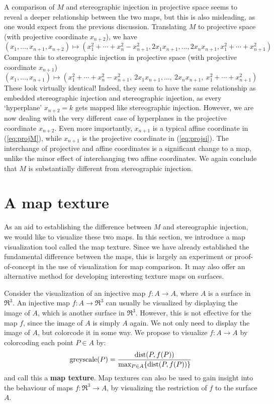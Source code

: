 A comparison of $M$ and stereographic injection in projective space seems
to reveal a deeper relationship between the two maps,
but this is also misleading, 
as one would expect from the previous discussion.
Translating $M$ to projective space (with projective coordinate $x_{n+2}$), 
we have
\begin{equation}
\label{eq:projM}
(x_1,\ldots,x_{n+1},x_{n+2}) \mapsto 
	(x_1^2 + \cdots + x_{n}^2 - x_{n+1}^2,
	 2x_1x_{n+1}, \ldots, 2x_nx_{n+1}, x_1^2 + \cdots + x_{n+1}^2)
\end{equation}
Compare this to stereographic injection in projective space (with projective
coordinate $x_{n+1}$)
\begin{equation}
\label{eq:projsi}
	(x_1,\ldots,x_{n+1}) \mapsto
	(x_1^2 + \cdots + x_n^2 - x_{n+1}^2,\ 2x_{1}x_{n+1}, \ldots,\ 2x_{n}x_{n+1},\ 
	x_1^2 + \cdots + x_{n+1}^2)
\end{equation}
These look virtually identical!
Indeed, they seem to have the same relationship as embedded stereographic
injection and stereographic injection,
as every `hyperplane' $x_{n+2}=k$ gets mapped 
like stereographic injection.
However, we are now dealing with the very different case of 
hyperplanes in the projective coordinate $x_{n+2}$.
Even more importantly, $x_{n+1}$ is a typical affine coordinate 
in (\ref{eq:projM}),
while $x_{n+1}$ is the projective coordinate in (\ref{eq:projsi}).
The interchange of projective and affine coordinates is a significant
change to a map, unlike the minor effect of interchanging two
affine coordinates.
We again conclude that $M$ is substantially different from stereographic
injection.

\section{A map texture}
\label{sec:maptexture}

As an aid to establishing the difference between $M$ and stereographic injection,
we would like to visualize these two maps.
In this section, we introduce a map visualization tool called the map texture.
Since we have already established the fundamental difference
between the maps, this is largely an experiment or proof-of-concept
in the use of visualization for map comparison.
It may also offer an alternative method for developing interesting texture
maps on surfaces.

Consider the visualization of an injective map $f: A \rightarrow A$,
where $A$ is a surface in $\Re^3$.
An injective map $f:A \rightarrow \Re^3$ can usually be visualized by
displaying the image of $A$, which is another surface in $\Re^3$.
However, this is not effective for the map $f$, since the image of $A$
is simply $A$ again.
We not only need to display the image of $A$, but colorcode it in some way.
We propose to visualize $f:A \rightarrow A$ by colorcoding each point $P \in A$
by:
\[
\mbox{greyscale}(P) = \frac{\mbox{dist}(P,f(P))}{\mbox{max}_{\footnotesize{P \in A}} 
				\{ \mbox{dist}(P,f(P))\}}
\]
and call this a {\bf map texture}.
Map textures can also be used to gain insight into
the behaviour of maps $f:\Re^{3} \rightarrow A$, by visualizing
the restriction of $f$ to the surface $A$.

